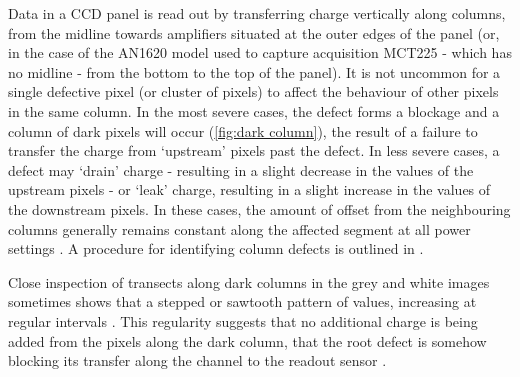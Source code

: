 \documentclass[\main/IO-Pixels.tex]{subfiles}
\begin{document}

Data in a CCD panel is read out by transferring charge vertically along columns,  from the midline towards amplifiers situated at the outer edges of the panel (or, in the case of the AN1620 model used to capture acquisition MCT225 - which has no midline - from the bottom to the top of the panel). It is not uncommon for a single defective pixel (or cluster of pixels) to affect the behaviour of other pixels in the same column. In the most severe cases, the defect forms a blockage and a column of dark pixels will occur (\autoref{fig:dark column}), the result of a failure to transfer the charge from `upstream' pixels past the defect. In less severe cases, a defect may `drain' charge - resulting in a slight decrease in the values of the upstream pixels - or `leak' charge, resulting in a slight increase in the values of the downstream pixels. In these cases, the amount of offset from the neighbouring columns generally remains constant along the affected segment at all power settings . A procedure for identifying column defects is outlined in .


Close inspection of transects along dark columns in the grey and white images sometimes shows that a stepped or sawtooth pattern of values, increasing at regular intervals  . This regularity suggests that no additional charge is being added from the pixels along the dark column, that the root defect is somehow blocking its transfer along the channel to the readout sensor .
\end{document}
